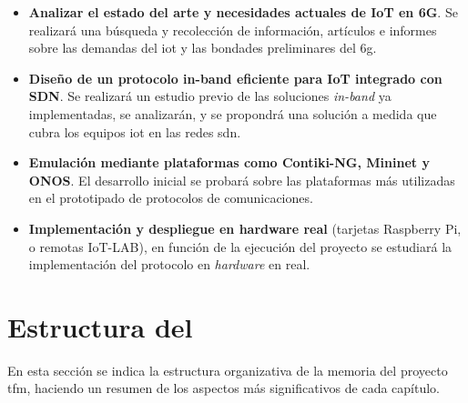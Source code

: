 \begin{itemize}
    \item \textbf{Analizar el estado del arte y necesidades actuales de IoT en 6G}. Se realizará una búsqueda y recolección de información, artículos e informes sobre las demandas del \gls{iot} y las bondades preliminares del \gls{6g}.
    \item \textbf{Diseño de un protocolo in-band eficiente para IoT integrado con SDN}. Se realizará un estudio previo de las soluciones \textit{in-band} ya implementadas, se analizarán, y se propondrá una solución a medida que cubra los equipos \gls{iot} en las redes \gls{sdn}.
    \item \textbf{Emulación mediante plataformas como Contiki-NG, Mininet y ONOS}. El desarrollo inicial se probará sobre las plataformas más utilizadas en el prototipado de protocolos de comunicaciones.
    \item \textbf{Implementación y despliegue en hardware real} (tarjetas Raspberry Pi, o remotas IoT-LAB), en función de la ejecución del proyecto se estudiará la implementación del protocolo en \textit{hardware} en real.
\end{itemize}





\section{Estructura del }
\label{sec:structure}


En esta sección se indica la estructura organizativa de la memoria del proyecto \gls{tfm}, haciendo un resumen de los aspectos más significativos de cada capítulo.


